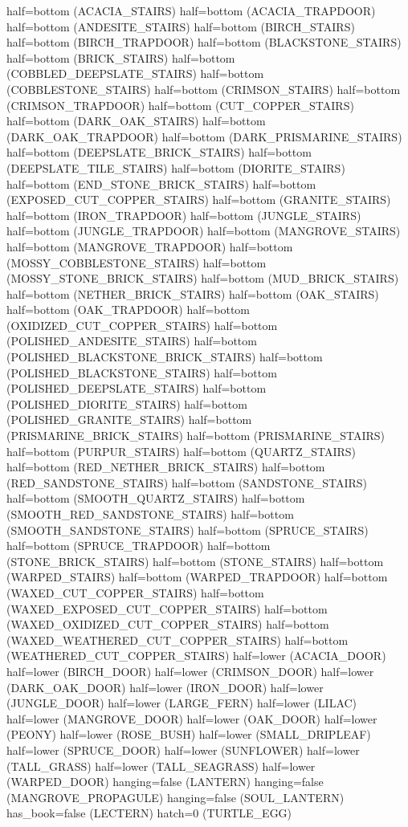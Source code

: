 \documentclass[11pt]{article}
\begin{document}
half=bottom (ACACIA_STAIRS)
half=bottom (ACACIA_TRAPDOOR)
half=bottom (ANDESITE_STAIRS)
half=bottom (BIRCH_STAIRS)
half=bottom (BIRCH_TRAPDOOR)
half=bottom (BLACKSTONE_STAIRS)
half=bottom (BRICK_STAIRS)
half=bottom (COBBLED_DEEPSLATE_STAIRS)
half=bottom (COBBLESTONE_STAIRS)
half=bottom (CRIMSON_STAIRS)
half=bottom (CRIMSON_TRAPDOOR)
half=bottom (CUT_COPPER_STAIRS)
half=bottom (DARK_OAK_STAIRS)
half=bottom (DARK_OAK_TRAPDOOR)
half=bottom (DARK_PRISMARINE_STAIRS)
half=bottom (DEEPSLATE_BRICK_STAIRS)
half=bottom (DEEPSLATE_TILE_STAIRS)
half=bottom (DIORITE_STAIRS)
half=bottom (END_STONE_BRICK_STAIRS)
half=bottom (EXPOSED_CUT_COPPER_STAIRS)
half=bottom (GRANITE_STAIRS)
half=bottom (IRON_TRAPDOOR)
half=bottom (JUNGLE_STAIRS)
half=bottom (JUNGLE_TRAPDOOR)
half=bottom (MANGROVE_STAIRS)
half=bottom (MANGROVE_TRAPDOOR)
half=bottom (MOSSY_COBBLESTONE_STAIRS)
half=bottom (MOSSY_STONE_BRICK_STAIRS)
half=bottom (MUD_BRICK_STAIRS)
half=bottom (NETHER_BRICK_STAIRS)
half=bottom (OAK_STAIRS)
half=bottom (OAK_TRAPDOOR)
half=bottom (OXIDIZED_CUT_COPPER_STAIRS)
half=bottom (POLISHED_ANDESITE_STAIRS)
half=bottom (POLISHED_BLACKSTONE_BRICK_STAIRS)
half=bottom (POLISHED_BLACKSTONE_STAIRS)
half=bottom (POLISHED_DEEPSLATE_STAIRS)
half=bottom (POLISHED_DIORITE_STAIRS)
half=bottom (POLISHED_GRANITE_STAIRS)
half=bottom (PRISMARINE_BRICK_STAIRS)
half=bottom (PRISMARINE_STAIRS)
half=bottom (PURPUR_STAIRS)
half=bottom (QUARTZ_STAIRS)
half=bottom (RED_NETHER_BRICK_STAIRS)
half=bottom (RED_SANDSTONE_STAIRS)
half=bottom (SANDSTONE_STAIRS)
half=bottom (SMOOTH_QUARTZ_STAIRS)
half=bottom (SMOOTH_RED_SANDSTONE_STAIRS)
half=bottom (SMOOTH_SANDSTONE_STAIRS)
half=bottom (SPRUCE_STAIRS)
half=bottom (SPRUCE_TRAPDOOR)
half=bottom (STONE_BRICK_STAIRS)
half=bottom (STONE_STAIRS)
half=bottom (WARPED_STAIRS)
half=bottom (WARPED_TRAPDOOR)
half=bottom (WAXED_CUT_COPPER_STAIRS)
half=bottom (WAXED_EXPOSED_CUT_COPPER_STAIRS)
half=bottom (WAXED_OXIDIZED_CUT_COPPER_STAIRS)
half=bottom (WAXED_WEATHERED_CUT_COPPER_STAIRS)
half=bottom (WEATHERED_CUT_COPPER_STAIRS)
half=lower (ACACIA_DOOR)
half=lower (BIRCH_DOOR)
half=lower (CRIMSON_DOOR)
half=lower (DARK_OAK_DOOR)
half=lower (IRON_DOOR)
half=lower (JUNGLE_DOOR)
half=lower (LARGE_FERN)
half=lower (LILAC)
half=lower (MANGROVE_DOOR)
half=lower (OAK_DOOR)
half=lower (PEONY)
half=lower (ROSE_BUSH)
half=lower (SMALL_DRIPLEAF)
half=lower (SPRUCE_DOOR)
half=lower (SUNFLOWER)
half=lower (TALL_GRASS)
half=lower (TALL_SEAGRASS)
half=lower (WARPED_DOOR)
hanging=false (LANTERN)
hanging=false (MANGROVE_PROPAGULE)
hanging=false (SOUL_LANTERN)
has_book=false (LECTERN)
hatch=0 (TURTLE_EGG)
\end{document}
